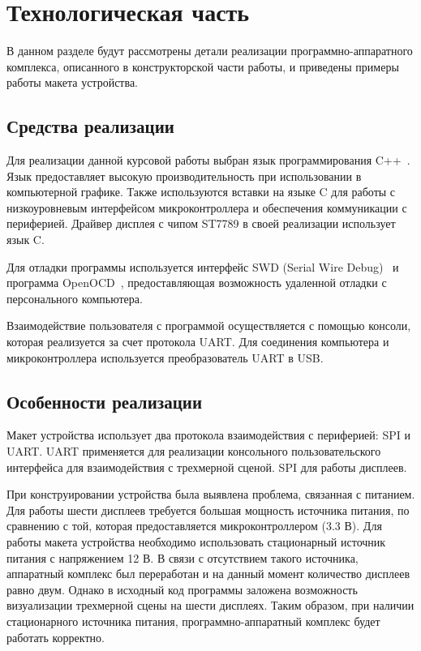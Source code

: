 \chapter{Технологическая часть}

В данном разделе будут рассмотрены детали реализации программно-аппаратного комплекса, описанного в конструкторской части работы, и приведены примеры работы макета устройства.

\section{Средства реализации}
Для реализации данной курсовой работы выбран язык программирования C++~\cite{cpp-lang}.
Язык предоставляет высокую производительность при использовании в компьютерной графике. Также используются вставки на языке C для работы с низкоуровневым интерфейсом микроконтроллера и обеспечения коммуникации с периферией. Драйвер дисплея с чипом ST7789 в своей реализации использует язык C. 

Для отладки программы используется интерфейс SWD (Serial Wire Debug)~\cite{swd} и программа OpenOCD~\cite{openocd}, предоставляющая возможность удаленной отладки с персонального компьютера. 

Взаимодействие пользователя с программой осуществляется с помощью консоли, которая реализуется за счет протокола UART. Для соединения компьютера и микроконтроллера используется преобразователь UART в USB.

\section{Особенности реализации}

Макет устройства использует два протокола взаимодействия с периферией: SPI и UART. UART применяется для реализации консольного пользовательского интерфейса для взаимодействия с трехмерной сценой. SPI для работы дисплеев.

При конструировании устройства была выявлена проблема, связанная с питанием. Для работы шести дисплеев требуется большая мощность источника питания, по сравнению с той, которая предоставляется микроконтроллером (3.3 В). Для работы макета устройства необходимо использовать стационарный источник питания с напряжением 12 В. В связи с отсутствием такого источника, аппаратный комплекс был переработан и на данный момент количество дисплеев равно двум. Однако в исходный код программы заложена возможность визуализации трехмерной сцены на шести дисплеях. Таким образом, при наличии стационарного источника питания, программно-аппаратный комплекс будет работать корректно. 

